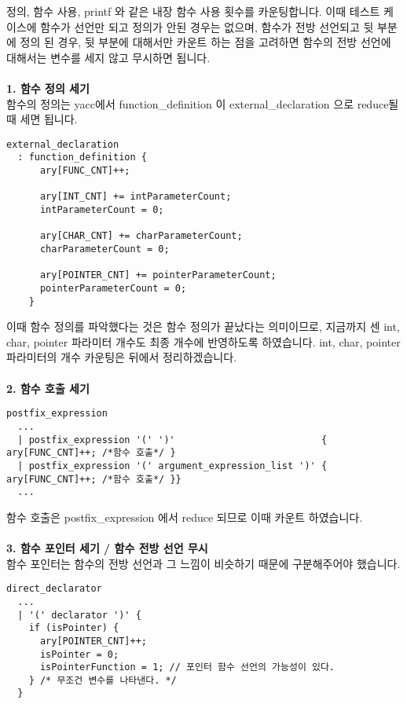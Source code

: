 \documentclass{article}
\begin{document}
 정의, 함수 사용, printf 와 같은 내장 함수 사용 횟수를 카운팅합니다.
이때 테스트 케이스에 함수가 선언만 되고 정의가 안된 경우는 없으며, 함수가 전방 선언되고 뒷 부분에 정의 된 경우, 뒷 부분에 대해서만 카운트 하는 점을 고려하면 함수의 전방 선언에 대해서는 변수를 세지 않고 무시하면 됩니다.\\\\
\textbf{1. 함수 정의 세기}\\
함수의 정의는 yacc에서 function\_definition 이 external\_declaration 으로 reduce될 때 세면 됩니다.
\begin{verbatim}
external_declaration
  : function_definition {
      ary[FUNC_CNT]++;

      ary[INT_CNT] += intParameterCount;
      intParameterCount = 0;

      ary[CHAR_CNT] += charParameterCount;
      charParameterCount = 0;

      ary[POINTER_CNT] += pointerParameterCount;
      pointerParameterCount = 0;
    }
\end{verbatim}
이때 함수 정의를 파악했다는 것은 함수 정의가 끝났다는 의미이므로, 지금까지 센 int, char, pointer 파라미터 개수도 최종 개수에 반영하도록 하였습니다.
int, char, pointer 파라미터의 개수 카운팅은 뒤에서 정리하겠습니다.\\\\
\textbf{2. 함수 호출 세기}\\
\begin{verbatim}
postfix_expression
  ...
  | postfix_expression '(' ')'                          { ary[FUNC_CNT]++; /*함수 호출*/ }
  | postfix_expression '(' argument_expression_list ')' { ary[FUNC_CNT]++; /*함수 호출*/ }}
  ...
\end{verbatim}
함수 호출은 postfix\_expression 에서 reduce 되므로 이때 카운트 하였습니다.\\\\
\textbf{3. 함수 포인터 세기 / 함수 전방 선언 무시}\\
함수 포인터는 함수의 전방 선언과 그 느낌이 비슷하기 때문에 구분해주어야 했습니다.
\begin{verbatim}
direct_declarator
  ...
  | '(' declarator ')' {
    if (isPointer) {
      ary[POINTER_CNT]++;
      isPointer = 0;
      isPointerFunction = 1; // 포인터 함수 선언의 가능성이 있다.
    } /* 무조건 변수를 나타낸다. */
  }
\end{verbatim}
\end{document}
